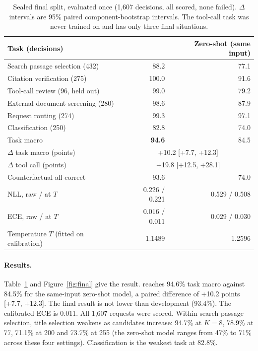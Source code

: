 \begin{table}[t]
\centering
\small
\caption{Sealed final split, evaluated once (1,607 decisions, all scored, none failed).
$\Delta$ intervals are 95\% paired component-bootstrap intervals. The tool-call task was
never trained on and has only three final situations.}
\label{tab:final}
\begin{tabular}{@{}lrr@{}}
\toprule
Task (decisions) & \expone{} & Zero-shot (same input) \\
\midrule
Search passage selection (432) & 88.2 & 77.1 \\
Citation verification (275) & 100.0 & 91.6 \\
Tool-call review (96, held out) & 99.0 & 79.2 \\
External document screening (280) & 98.6 & 87.9 \\
Request routing (274) & 99.3 & 97.1 \\
Classification (250) & 82.8 & 74.0 \\
\midrule
Task macro & \textbf{94.6} & 84.5 \\
$\Delta$ task macro (points) & \multicolumn{2}{c}{+10.2 [+7.7, +12.3]} \\
$\Delta$ tool call (points) & \multicolumn{2}{c}{+19.8 [+12.5, +28.1]} \\
Counterfactual all correct & 93.6 & 74.0 \\
NLL, raw / at $T$ & 0.226 / 0.221 & 0.529 / 0.508 \\
ECE, raw / at $T$ & 0.016 / 0.011 & 0.029 / 0.030 \\
Temperature $T$ (fitted on calibration) & 1.1489 & 1.2596 \\
\bottomrule
\end{tabular}
\end{table}

\paragraph{Results.}
Table~\ref{tab:final} and Figure~\ref{fig:final} give the result. \expone{} reaches 94.6\%
task macro against 84.5\% for the same-input zero-shot model, a paired difference of +10.2
points [+7.7, +12.3]. The final result is not lower than development (93.4\%). The
calibrated ECE is 0.011. All 1,607 requests were scored. Within search passage selection,
title selection weakens as candidates increase: 94.7\% at $K=8$, 78.9\% at 77, 71.1\% at 200
and 73.7\% at 255 (the zero-shot model ranges from 47\% to 71\% across these four settings).
Classification is the weakest task at 82.8\%.

